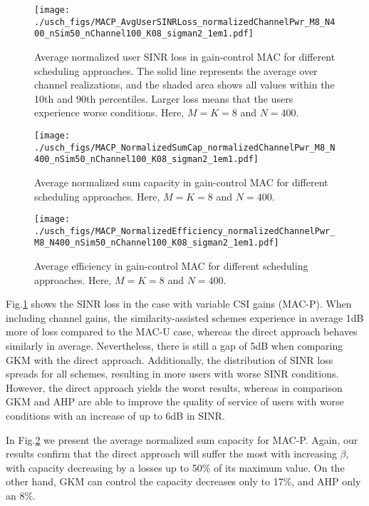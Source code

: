 \begin{figure}[tb]
	\centering
	\texttt{[image: ./usch\_figs/MACP\_AvgUserSINRLoss\_normalizedChannelPwr\_M8\_N400\_nSim50\_nChannel100\_K08\_sigman2\_1em1.pdf]}
	\caption{Average normalized user SINR loss in gain-control MAC for different scheduling approaches. The solid line represents the average over channel realizations, and the shaded area shows all values within the 10th and 90th percentiles. Larger loss means that the users experience worse conditions. Here, $M=K=8$ and $N=400$.}
	\label{fig:MACP_sinrLoss_M8_N400}
\end{figure}
\begin{figure}[tb]
	\centering
	\texttt{[image: ./usch\_figs/MACP\_NormalizedSumCap\_normalizedChannelPwr\_M8\_N400\_nSim50\_nChannel100\_K08\_sigman2\_1em1.pdf]}
	\caption{Average normalized sum capacity in gain-control MAC for different scheduling approaches. Here, $M=K=8$ and $N=400$.}
	\label{fig:MACP_sumcapacity_M8_N400}
\end{figure}
\begin{figure}[tb]
	\centering
	\texttt{[image: ./usch\_figs/MACP\_NormalizedEfficiency\_normalizedChannelPwr\_M8\_N400\_nSim50\_nChannel100\_K08\_sigman2\_1em1.pdf]}
	\caption{Average efficiency in gain-control MAC for different scheduling approaches. Here, $M=K=8$ and $N=400$.}
	\label{fig:MACP_efficiency_M8_N400}
\end{figure}
Fig.\ref{fig:MACP_sinrLoss_M8_N400} shows the SINR loss in the case with variable CSI gains (MAC-P). When including channel gains, the similarity-assisted schemes experience in average 1dB more of loss compared to the MAC-U case, whereas the direct approach behaves similarly in average. Nevertheless, there is still a gap of 5dB when comparing GKM with the direct approach. Additionally, the distribution of SINR loss spreads for all schemes, resulting in more users with worse SINR conditions. However, the direct approach yields the worst results, whereas in comparison GKM and AHP are able to improve the quality of service of users with worse conditions with an increase of up to 6dB in SINR. 

In Fig.\ref{fig:MACP_sumcapacity_M8_N400} we present the average normalized sum capacity for MAC-P. Again, our results confirm that the direct approach will suffer the most with increasing $\beta$, with capacity decreasing by a losses up to 50\% of its maximum value. On the other hand, GKM can control the capacity decreases only to 17\%, and AHP only an 8\%.


